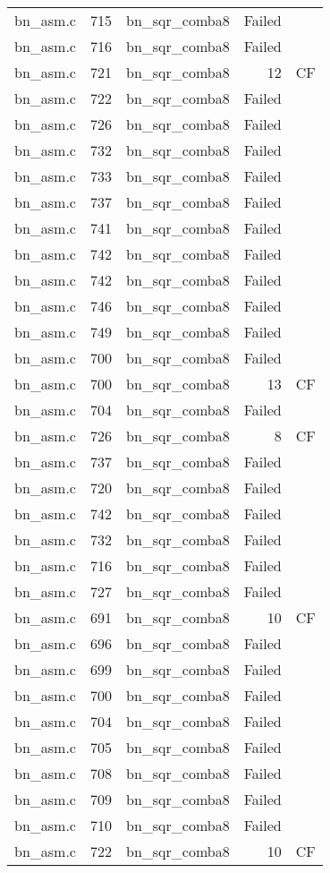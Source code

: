 \begin{table}[h]
{\begin{tabular}{clrrr}
bn\_asm.c&715&bn\_sqr\_comba8&Failed&\\
bn\_asm.c&716&bn\_sqr\_comba8&Failed&\\
bn\_asm.c&721&bn\_sqr\_comba8&12&CF\\
bn\_asm.c&722&bn\_sqr\_comba8&Failed&\\
bn\_asm.c&726&bn\_sqr\_comba8&Failed&\\
bn\_asm.c&732&bn\_sqr\_comba8&Failed&\\
bn\_asm.c&733&bn\_sqr\_comba8&Failed&\\
bn\_asm.c&737&bn\_sqr\_comba8&Failed&\\
bn\_asm.c&741&bn\_sqr\_comba8&Failed&\\
bn\_asm.c&742&bn\_sqr\_comba8&Failed&\\
bn\_asm.c&742&bn\_sqr\_comba8&Failed&\\
bn\_asm.c&746&bn\_sqr\_comba8&Failed&\\
bn\_asm.c&749&bn\_sqr\_comba8&Failed&\\
bn\_asm.c&700&bn\_sqr\_comba8&Failed&\\
bn\_asm.c&700&bn\_sqr\_comba8&13&CF\\
bn\_asm.c&704&bn\_sqr\_comba8&Failed&\\
bn\_asm.c&726&bn\_sqr\_comba8&8 &CF\\
bn\_asm.c&737&bn\_sqr\_comba8&Failed&\\
bn\_asm.c&720&bn\_sqr\_comba8&Failed&\\
bn\_asm.c&742&bn\_sqr\_comba8&Failed&\\
bn\_asm.c&732&bn\_sqr\_comba8&Failed&\\
bn\_asm.c&716&bn\_sqr\_comba8&Failed&\\
bn\_asm.c&727&bn\_sqr\_comba8&Failed&\\
bn\_asm.c&691&bn\_sqr\_comba8&10&CF\\
bn\_asm.c&696&bn\_sqr\_comba8&Failed&\\
bn\_asm.c&699&bn\_sqr\_comba8&Failed&\\
bn\_asm.c&700&bn\_sqr\_comba8&Failed&\\
bn\_asm.c&704&bn\_sqr\_comba8&Failed&\\
bn\_asm.c&705&bn\_sqr\_comba8&Failed&\\
bn\_asm.c&708&bn\_sqr\_comba8&Failed&\\
bn\_asm.c&709&bn\_sqr\_comba8&Failed&\\
bn\_asm.c&710&bn\_sqr\_comba8&Failed&\\
bn\_asm.c&722&bn\_sqr\_comba8&10&CF\\

\end{tabular}}
\end{table}
